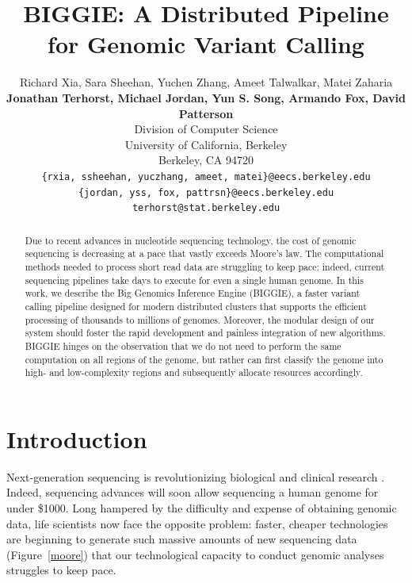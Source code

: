 \documentclass[10pt]{article}
\begin{document}
\title{BIGGIE: A Distributed Pipeline for Genomic Variant Calling}
\author{
Richard Xia, Sara Sheehan, Yuchen Zhang, Ameet Talwalkar, Matei Zaharia \\
\textbf{Jonathan Terhorst, Michael Jordan, Yun S. Song, Armando Fox, David Patterson} \\
Division of Computer Science\\
University of California, Berkeley\\
Berkeley, CA 94720 \\
\texttt{\{rxia, ssheehan, yuczhang, ameet, matei\}@eecs.berkeley.edu} \\
\texttt{\{jordan, yss, fox, pattrsn\}@eecs.berkeley.edu} \\
\texttt{terhorst@stat.berkeley.edu}
}
\maketitle

\begin{abstract}
Due to recent advances in nucleotide sequencing technology, the cost of genomic
sequencing is decreasing at a pace that vastly exceeds Moore's law.  The
computational methods needed to process short read data are struggling to keep
pace; indeed, current sequencing pipelines take days to execute for even a
single human genome.  In this work, we describe the Big Genomics Inference
Engine (BIGGIE), a faster variant calling pipeline designed for modern
distributed clusters that supports the efficient processing of thousands to
millions of genomes.  Moreover, the modular design of our system should foster
the rapid development and painless integration of new algorithms.  BIGGIE
hinges on the observation that we do not need to perform the same computation
on all regions of the genome, but rather can first classify the genome into
high- and low-complexity regions and subsequently allocate resources
accordingly.
\end{abstract}

\twocolumn

\section{Introduction}

Next-generation sequencing is revolutionizing biological and clinical research
\cite{schuster}.  Indeed, sequencing advances will soon allow sequencing a
human genome for under \$1000. Long hampered by the difficulty and
expense of obtaining genomic data, life scientists now face the opposite
problem: faster, cheaper technologies are beginning to generate such massive
amounts of new sequencing data (Figure~\ref{moore}) that our technological
capacity to conduct genomic analyses struggles to keep pace. 
\end{document}
